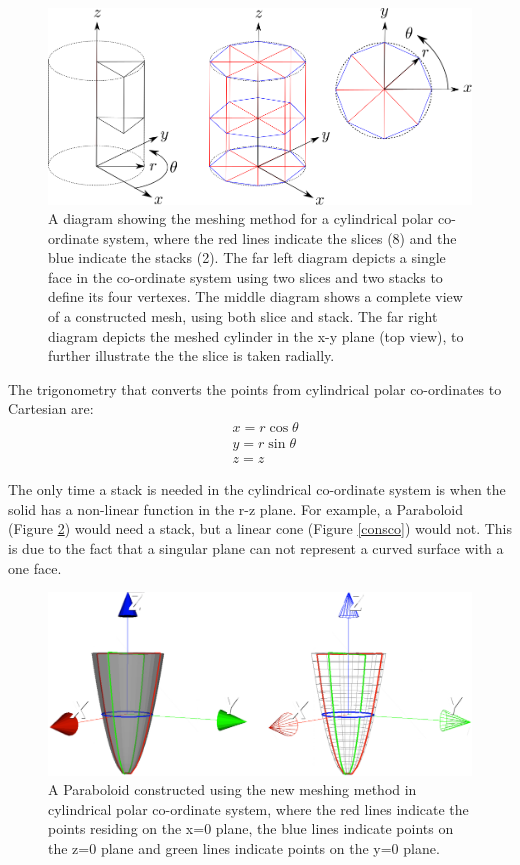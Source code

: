\documentclass[12pt,a4paper]{article}
\begin{document}
\begin{figure}[h!]
\centering
\includegraphics[scale=0.45]{Images//Coords//cyl.png}
\caption[width=\columnwidth]{A diagram showing the meshing method for a cylindrical polar co-ordinate system, where the red lines indicate the slices (8) and the blue indicate the stacks (2). The far left diagram depicts a single face in the co-ordinate system using two slices and two stacks to define its four vertexes. The middle diagram shows a complete view of a constructed mesh, using both slice and stack. The far right diagram depicts the meshed cylinder in the x-y plane (top view), to further illustrate the the slice is taken radially.}
\label{cylmeshin}
\end{figure}
The trigonometry that converts the points from cylindrical polar co-ordinates to Cartesian are:
\begin{equation}
\begin{aligned}
\label{cyctrig}
& x = r \cos{\theta} \\
& y = r \sin{\theta} \\
& z = z
\end{aligned}
\end{equation}

\noindent The only time a stack is needed in the cylindrical co-ordinate system is when the solid has a non-linear function in the r-z plane. For example, a Paraboloid (Figure \ref{paraco}) would need a stack, but a linear cone (Figure \ref{consco}) would not. This is due to the fact that a singular plane can not represent a curved surface with a one face. 

\begin{figure}[h!]
\centering
\includegraphics[scale=0.3]{Images//Coords//para.png}
\caption[width=\columnwidth]{A Paraboloid constructed using the new meshing method in cylindrical polar co-ordinate system, where the red lines indicate the points residing on the x=0 plane, the blue lines indicate points on the z=0 plane and green lines indicate points on the y=0 plane.}
\label{paraco}
\end{figure}
\end{document}
